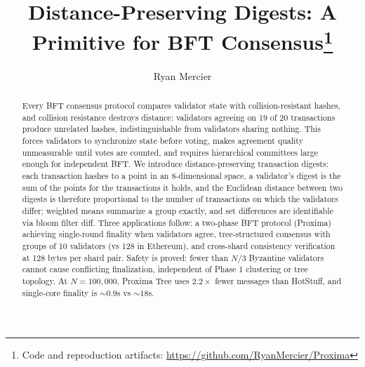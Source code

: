 \documentclass[runningheads]{llncs}
\begin{document}
\title{Distance-Preserving Digests: A Primitive for BFT Consensus\thanks{Code and reproduction artifacts: \url{https://github.com/RyanMercier/Proxima}}}

\author{Ryan Mercier}


\maketitle
\thispagestyle{empty}

\begin{abstract}
Every BFT consensus protocol compares validator state with collision-resistant hashes, and collision resistance destroys distance: validators agreeing on 19 of 20 transactions produce unrelated hashes, indistinguishable from validators sharing nothing. This forces validators to synchronize state before voting, makes agreement quality unmeasurable until votes are counted, and requires hierarchical committees large enough for independent BFT. We introduce distance-preserving transaction digests: each transaction hashes to a point in an 8-dimensional space, a validator's digest is the sum of the points for the transactions it holds, and the Euclidean distance between two digests is therefore proportional to the number of transactions on which the validators differ; weighted means summarize a group exactly, and set differences are identifiable via bloom filter diff. Three applications follow: a two-phase BFT protocol (Proxima) achieving single-round finality when validators agree, tree-structured consensus with groups of 10 validators (vs 128 in Ethereum), and cross-shard consistency verification at 128 bytes per shard pair. Safety is proved: fewer than $N/3$ Byzantine validators cannot cause conflicting finalization, independent of Phase 1 clustering or tree topology. At $N{=}100{,}000$, Proxima Tree uses $2.2\times$ fewer messages than HotStuff, and single-core finality is $\sim\!0.9$s vs $\sim\!18$s.

\end{abstract}

\end{document}
